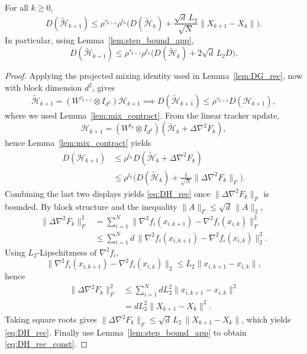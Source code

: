 \documentclass[review,onefignum,onetabnum]{siamart171218}
\begin{document}
	\begin{lemma}\label{lem:DH_rec}
		For all $k\ge0$,
		\begin{equation}\label{eq:DH_rec}
			D(\tilde{\mathcal H}_{k+1})
			\le \rho^{\tau_{k+1}}\rho^{t_k}\Big(D(\tilde{\mathcal H}_k)+\frac{\sqrt d\,L_2}{\sqrt N}\|X_{k+1}-X_k\|\Big).
		\end{equation}
		In particular, using Lemma~\ref{lem:step_bound_app},
		\begin{equation}\label{eq:DH_rec_const}
			D(\tilde{\mathcal H}_{k+1})
			\le \rho^{\tau_{k+1}}\rho^{t_k}\Big(D(\tilde{\mathcal H}_k)+2\sqrt d\,L_2D\Big).
		\end{equation}
	\end{lemma}
	\begin{proof}
		Applying the projected mixing identity used in
		Lemma~\ref{lem:DG_rec}, now with block dimension $d^2$, gives
		\[
		\tilde{\mathcal H}_{k+1} = (W^{\tau_{k+1}}\!\otimes\! I_{d^2})\mathcal H_{k+1} \implies
		D(\tilde{\mathcal H}_{k+1}) \le \rho^{\tau_{k+1}} D(\mathcal H_{k+1}),
		\]
		where we used Lemma~\ref{lem:mix_contract}. From the linear tracker update,
		\[
		\mathcal H_{k+1} = (W^{t_k}\!\otimes\! I_{d^2})(\tilde{\mathcal H}_k\!+\!\Delta\nabla^2 F_k),
		\]
		hence Lemma~\ref{lem:mix_contract} yields
		\begin{align*}
			D(\mathcal H_{k+1})
			&\le \rho^{t_k}D(\tilde{\mathcal H}_k\!+\!\Delta\nabla^2 F_k)\\
			&\le \rho^{t_k}\!\Big(D(\tilde{\mathcal H}_k)\!+\!\tfrac1{\sqrt N}\|\Delta\nabla^2 F_k\|_F\Big).
		\end{align*}
		Combining the last two displays yields \eqref{eq:DH_rec} once
		$\|\Delta\nabla^2F_k\|_F$ is bounded.
		By block structure and the inequality $\|A\|_F\le \sqrt d\,\|A\|_2$,
		\begin{align*}
			\|\Delta\nabla^2 F_k\|_F^2
			&=\textstyle\sum_{i=1}^N\|\nabla^2 f_i(x_{i,k+1})\!-\!\nabla^2 f_i(x_{i,k})\|_F^2\\
			&\le \textstyle\sum_{i=1}^N d\,\|\nabla^2 f_i(x_{i,k+1})\!-\!\nabla^2 f_i(x_{i,k})\|_2^2.
		\end{align*}
		Using $L_2$-Lipschitzness of $\nabla^2 f_i$,
		\[
		\|\nabla^2 f_i(x_{i,k+1})\!-\!\nabla^2 f_i(x_{i,k})\|_2\le L_2\|x_{i,k+1}\!-\!x_{i,k}\|,
		\]
		hence
		\begin{align*}
			\|\Delta\nabla^2 F_k\|_F^2
			&\le \textstyle\sum_{i=1}^N d L_2^2\|x_{i,k+1}\!-\!x_{i,k}\|^2\\
			&= dL_2^2\|X_{k+1}\!-\!X_k\|^2.
		\end{align*}
		Taking square roots gives $\|\Delta\nabla^2 F_k\|_F\le \sqrt d\,L_2\,\|X_{k+1}-X_k\|$,
		which yields \eqref{eq:DH_rec}. Finally use Lemma~\ref{lem:step_bound_app} to obtain \eqref{eq:DH_rec_const}.
	\end{proof}
	
\end{document}
